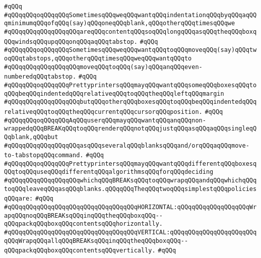 \verb|#qQQq|\newline
\verb|#qQQqqQQqoqQQqqQQqSometimesqQQqweqQQqwantqQQqindentationqQQqbyqQQqaqQQqminimumqQQqofqQQq(say)qQQqoneqQQqblank,qQQqotherqQQqtimesqQQqwe|\newline
\verb|#qQQqqQQqqQQqqQQqqQQqareqQQqcontentqQQqsoqQQqlongqQQqasqQQqtheqQQqboxqQQqwindsqQQqupqQQqonqQQqaqQQqtabstop.|\newline
\verb|#qQQq|\newline
\verb|#qQQqqQQqoqQQqqQQqSometimesqQQqweqQQqwantqQQqtoqQQqmoveqQQq(say)qQQqtwoqQQqtabstops,qQQqotherqQQqtimesqQQqweqQQqwantqQQqto|\newline
\verb|#qQQqqQQqqQQqqQQqqQQqmoveqQQqtoqQQq(say)qQQqanqQQqeven-numberedqQQqtabstop.|\newline
\verb|#qQQq|\newline
\verb|#qQQqqQQqoqQQqqQQqPrettyprintersqQQqmayqQQqwantqQQqsomeqQQqboxesqQQqtoqQQqbeqQQqindentedqQQqrelativeqQQqtoqQQqtheqQQqleftqQQqmargin|\newline
\verb|#qQQqqQQqqQQqqQQqqQQqbutqQQqotherqQQqboxesqQQqtoqQQqbeqQQqindentedqQQqrelativeqQQqtoqQQqtheqQQqcurrentqQQqcursorqQQqposition.|\newline
\verb|#qQQq|\newline
\verb|#qQQqqQQqoqQQqqQQqAqQQquserqQQqmayqQQqwantqQQqanqQQqnon-wrappedqQQqBREAKqQQqtoqQQqrenderqQQqnotqQQqjustqQQqasqQQqaqQQqsingleqQQqblank,qQQqbut|\newline
\verb|#qQQqqQQqqQQqqQQqqQQqasqQQqseveralqQQqblanksqQQqand/orqQQqaqQQqmove-to-tabstopqQQqcommand.|\newline
\verb|#qQQq|\newline
\verb|#qQQqqQQqoqQQqqQQqPrettyprintersqQQqmayqQQqwantqQQqdifferentqQQqboxesqQQqtoqQQquseqQQqdifferentqQQqalgorithmsqQQqforqQQqdeciding|\newline
\verb|#qQQqqQQqqQQqqQQqqQQqwhichqQQqBREAKsqQQqtoqQQqwrapqQQqandqQQqwhichqQQqtoqQQqleaveqQQqasqQQqblanks.qQQqqQQqTheqQQqtwoqQQqsimplestqQQqpoliciesqQQqare:|\newline
\verb|#qQQq|\newline
\verb|#qQQqqQQqqQQqqQQqqQQqqQQqqQQqqQQqqQQqHORIZONTAL:qQQqqQQqqQQqqQQqqQQqWrapqQQqnoqQQqBREAKsqQQqinqQQqtheqQQqboxqQQq--qQQqpackqQQqboxqQQqcontentsqQQqhorizontally.|\newline
\verb|#qQQqqQQqqQQqqQQqqQQqqQQqqQQqqQQqqQQqVERTICAL:qQQqqQQqqQQqqQQqqQQqqQQqqQQqWrapqQQqallqQQqBREAKsqQQqinqQQqtheqQQqboxqQQq--qQQqpackqQQqboxqQQqcontentsqQQqvertically.|\newline
\verb|#qQQq|\newline
